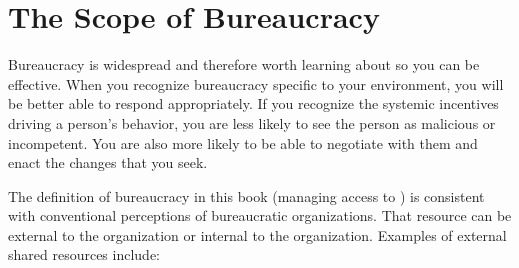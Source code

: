 \section{The Scope of Bureaucracy}
Bureaucracy is widespread and therefore worth learning about so you can be effective.  When you recognize bureaucracy specific to your environment, you will be better able to respond appropriately. If you recognize the systemic incentives driving a person's behavior, you are less likely to see the person as malicious or incompetent. You are also more likely to be able to negotiate with them and enact the changes that you seek.


The definition of bureaucracy in this book (managing access to 
\iftoggle{glossarysubstitutionworks}{\glspl{shared resource}}{shared resources}) 
is consistent with conventional perceptions of bureaucratic organizations. 
That resource can be external to the organization or internal to the organization. Examples of external shared resources include:

